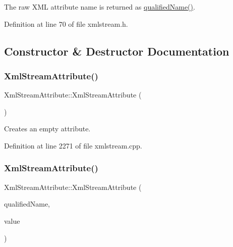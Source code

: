 The raw X\+ML attribute name is returned as \hyperlink{class_xml_stream_attribute_acc21c4ce8b0539d6c1131ab789171dd9}{qualified\+Name()}. 

Definition at line 70 of file xmlstream.\+h.



\subsection{Constructor \& Destructor Documentation}
\mbox{\label{class_xml_stream_attribute_aa5f200993700468c044eadc4ce7ae89f}} 
\subsubsection{\texorpdfstring{Xml\+Stream\+Attribute()}{XmlStreamAttribute()}\hspace{0.1cm}{\footnotesize\ttfamily [1/4]}}
{\footnotesize\ttfamily Xml\+Stream\+Attribute\+::\+Xml\+Stream\+Attribute (\begin{DoxyParamCaption}{ }\end{DoxyParamCaption})}

Creates an empty attribute. 

Definition at line 2271 of file xmlstream.\+cpp.

\mbox{\label{class_xml_stream_attribute_aa6fb4b0b8a1b67e82eb96f1ca18433a0}} 
\subsubsection{\texorpdfstring{Xml\+Stream\+Attribute()}{XmlStreamAttribute()}\hspace{0.1cm}{\footnotesize\ttfamily [2/4]}}
{\footnotesize\ttfamily Xml\+Stream\+Attribute\+::\+Xml\+Stream\+Attribute (\begin{DoxyParamCaption}\item[{const Q\+String \&}]{qualified\+Name,  }\item[{const Q\+String \&}]{value }\end{DoxyParamCaption})}

